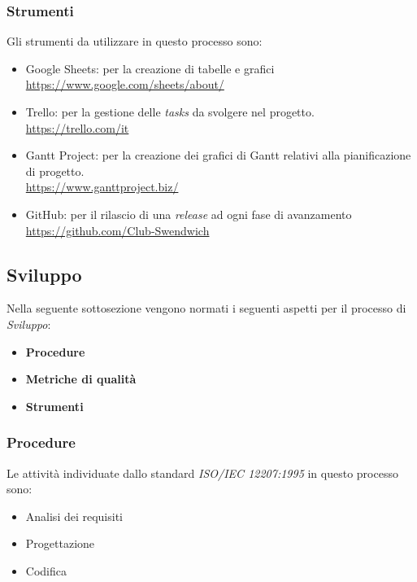 \subsubsection{Strumenti}
Gli strumenti da utilizzare in questo processo sono:

\begin{itemize}
    \item Google Sheets: per la creazione di tabelle e grafici \\
    \href{https://www.google.com/sheets/about/}{https://www.google.com/sheets/about/}
    \item Trello: per la gestione delle \textit{tasks} da svolgere nel progetto.\\
    \href{https://trello.com/it}{https://trello.com/it}
    \item Gantt Project: per la creazione dei grafici di Gantt relativi alla pianificazione di progetto.\\
    \href{https://www.ganttproject.biz/}{https://www.ganttproject.biz/}
    \item GitHub: per il rilascio di una \textit{release} ad ogni fase di avanzamento\\
    \href{https://github.com/Club-Swendwich}{https://github.com/Club-Swendwich}
\end{itemize}

\subsection{Sviluppo}
Nella seguente sottosezione vengono normati i seguenti aspetti per il 
processo di \textit{Sviluppo}:
\begin{itemize}
    \item \textbf{Procedure}
    \item \textbf{Metriche di qualità}
    \item \textbf{Strumenti}
\end{itemize}

\subsubsection{Procedure}

Le attività individuate dallo standard \textit{ISO/IEC 12207:1995} in questo processo sono:
\begin{itemize}
    \item Analisi dei requisiti
    \item Progettazione
    \item Codifica
\end{itemize}

